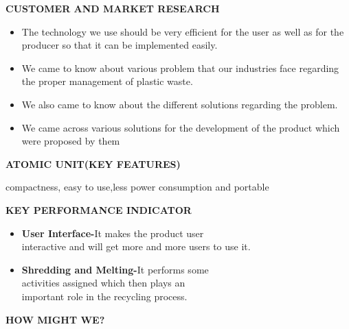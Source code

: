 \documentclass{article}
\begin{document}
\begin{center}
    \LARGE{\textsc {\textbf{CUSTOMER AND MARKET RESEARCH }}}\\[0.5cm]
\end{center}
\begin{itemize}
\Large
    \item The technology we use should be very efficient for the user as well as for the producer so that it can be implemented easily.
 \item We came to know about various problem that our industries face regarding the proper management of plastic waste.
\item We also came to know about the different solutions regarding the problem.
\item We came across various solutions for the development of the product which were proposed by them 
\end{itemize}
\vspace{0.5cm}
\begin{center}
    \LARGE{\textsc {\textbf{ATOMIC UNIT(KEY FEATURES)}}}\\[0.5cm]
\end{center}
\begin{flushleft}
\Large
    compactness, easy to use,less power consumption and portable
\end{flushleft}
\vspace{0.5cm}
\begin{center}
    \LARGE{\textsc {\textbf{KEY PERFORMANCE INDICATOR}}}\\[0.5cm]
\end{center}
\begin{itemize}
\Large
    \item \textbf{User Interface-}It makes the product user \\interactive and will get more and more users to use it. 
\item \textbf{Shredding and Melting-}It performs some \\activities assigned which then plays an \\important role in the recycling process.
\end{itemize}
\newpage

\begin{center}
    
    \LARGE{\textsc {\textbf{HOW MIGHT WE?}}}\\[0.5cm]
    
\end{center}
\end{document}

